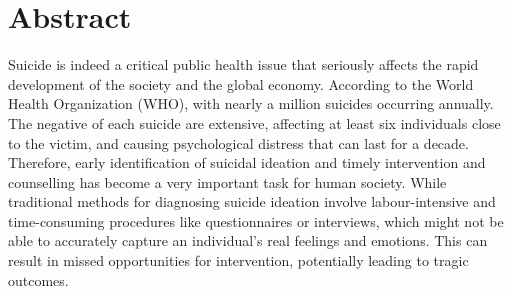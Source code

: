 \documentclass[ %
                    author={Bocheng Wang},
                supervisor={Dr. Qiang Liu},
                    degree={MSc},
                     title={A Research on Identification of Suicide Ideation in Texts with Multiple Models},
                      type={},
                      year={2024}]{dissertation}
\begin{document}



\maketitle


\frontmatter


\makedecl


\tableofcontents
\listoffigures
\listoftables



\chapter*{Abstract}
\noindent
Suicide is indeed a critical public health issue that seriously affects the rapid development of the society and the global economy. According to the World Health Organization (WHO), with nearly a million suicides occurring annually. The negative of each suicide are extensive, affecting at least six individuals close to the victim, and causing psychological distress that can last for a decade. Therefore, early identification of suicidal ideation and timely intervention and counselling has become a very important task for human society. While traditional methods for diagnosing suicide ideation involve labour-intensive and time-consuming procedures like questionnaires or interviews, which might not be able to accurately capture an individual's real feelings and emotions. This can result in missed opportunities for intervention, potentially leading to tragic outcomes.
\end{document}
